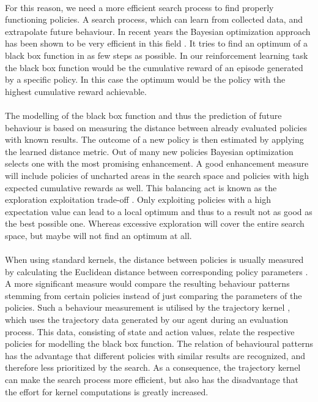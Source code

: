 \\
For this reason, we need a more efficient search process to find properly functioning policies. A search process, which can learn from collected data, and extrapolate future behaviour. In recent years the Bayesian optimization approach has been shown to be very efficient in this field \cite{brochu2010tutorial, shahriari2016taking, lizotte2008practical}. It tries to find an optimum of a black box function in as few steps as possible. In our reinforcement learning task the black box function would be the cumulative reward of an episode generated by a specific policy. In this case the optimum would be the policy with the highest cumulative reward achievable.\\
\\
The modelling of the black box function and thus the prediction of future behaviour is based on measuring the distance between already evaluated policies with known results. The outcome of a new policy is then estimated by applying the learned distance metric. Out of many new policies Bayesian optimization selects one with the most promising enhancement. A good enhancement measure will include policies of uncharted areas in the search space and policies with high expected cumulative rewards as well. This balancing act is known as the exploration exploitation trade-off \cite{brochu2010tutorial}. Only exploiting policies with a high expectation value can lead to a local optimum and thus to a result not as good as the best possible one. Whereas excessive exploration will cover the entire search space, but maybe will not find an optimum at all.\\
\\
When using standard kernels, the distance between policies is usually measured by calculating the Euclidean distance between corresponding policy parameters \cite{rasmussen2006gaussian}. A more significant measure would compare the resulting behaviour patterns stemming from certain policies instead of just comparing the parameters of the policies. Such a behaviour measurement is utilised by the trajectory kernel \cite{wilson2014using}, which uses the trajectory data generated by our agent during an evaluation process. This data, consisting of state and action values, relate the respective policies for modelling the black box function. The relation of behavioural patterns has the advantage that different policies with similar results are recognized, and therefore less prioritized by the search. As a consequence, the trajectory kernel can make the search process more efficient, but also has the disadvantage that the effort for kernel computations is greatly increased.\\
